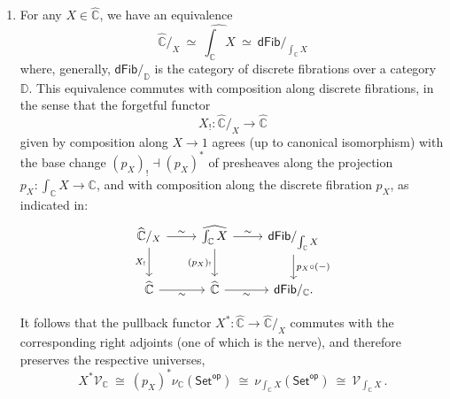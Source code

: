 \documentclass[12pt]{article}
\newcommand{\bbC}{\ensuremath{\mathbb{C}}}
\newcommand{\Set}{\ensuremath{\mathsf{Set}}}
\renewcommand{\to}{\ensuremath{\rightarrow}}
\newcommand{\V}{\ensuremath{\mathcal{V}}}
\theoremstyle{remark}
\theoremstyle{definition}
\begin{document}
\begin{enumerate}
\item For any $X\in \widehat{\bbC}$, we have an equivalence 
\[
\widehat{\bbC}/_X\ %
\simeq\ \widehat{\textstyle \int_{\bbC}X}\ \simeq\ \mathsf{dFib}/_{\int_{\bbC}X}
\]
where, generally, $\mathsf{dFib}/_{\mathbb{D}}$ is the category of discrete fibrations over a category $\mathbb{D}$.
This equivalence commutes with composition along discrete fibrations, in the sense that the forgetful functor $${X_!}: \widehat{\bbC}/_X \to \widehat{\bbC}$$ given by composition along $X \to 1$ agrees (up to canonical isomorphism) with the base change $(p_X)_! \dashv (p_X)^*$ of presheaves along the projection  ${\textstyle  p_X : \int_{\bbC}X \to  \bbC}$, and with composition along the discrete fibration $p_X$, as indicated in:
\begin{equation}\label{diagram:sliceuniversepullsback}
\begin{tikzcd}
\widehat{\bbC}/_X  \ar[d,swap,"{{X_!}}"] \ar[r, "{\sim}"] 
	& \widehat{\textstyle \int_{\bbC}X} \ar[d,swap,"{{(p_X)_!}}"] \ar[r, "{\sim}"] 
		& \mathsf{dFib}/_{\int_{\bbC}X} \ar[d,"p_X\circ(-)"]  \\
 \widehat{\bbC}  \ar[r,swap, "{\sim}"]   & \widehat{\bbC}  \ar[r,swap, "{\sim}"] 
	&  \mathsf{dFib}/_{\bbC}.
\end{tikzcd}
\end{equation}

It follows that the pullback functor $X^* : \widehat{\bbC} \to \widehat{\bbC}/_X$ commutes with the corresponding right adjoints (one of which is the nerve), and therefore preserves the respective universes, 
\[\textstyle
 X^* \V_{\bbC} \ 
   \cong\ (p_X)^* \nu_{\bbC}(\Set^{\mathsf{op}}) \ 
   \cong\  \nu_{\int_{\bbC}X}(\Set^{\mathsf{op}}) \ 
   \cong\  \V_{ \int_{\bbC}X} \,.
 \]


\end{enumerate}
\end{document}
